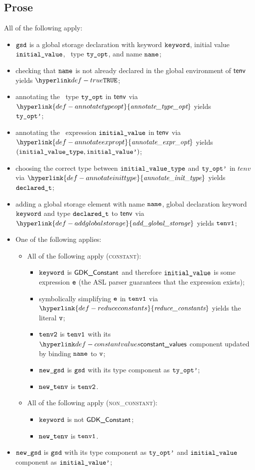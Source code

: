 \documentclass{book}
\newcommand\ProseOrTypeError[0]{\ProseTerminateAs{\TypeErrorConfig}}
\newcommand\annotatetypeopt[0]{\hyperlink{def-annotatetypeopt}{\textfunc{annotate\_type\_opt}}}
\newcommand\annotateexpropt[0]{\hyperlink{def-annotateexpropt}{\textfunc{annotate\_expr\_opt}}}
\newcommand\annotateinittype[0]{\hyperlink{def-annotateinittype}{\textfunc{annotate\_init\_type}}}
\newcommand\addglobalstorage[0]{\hyperlink{def-addglobalstorage}{\textfunc{add\_global\_storage}}}
\newcommand\reduceconstants[0]{\hyperlink{def-reduceconstants}{\textfunc{reduce\_constants}}}
\begin{document}
\subsection{Prose}
All of the following apply:
\begin{itemize}
  \item $\texttt{gsd}$ is a global storage declaration with keyword $\texttt{keyword}$, initial value \\ $\texttt{initial\_value}$,
        \optional\ type $\texttt{ty\_opt}$, and name $\texttt{name}$;
  \item checking that $\texttt{name}$ is not already declared in the global environment of $\textsf{tenv}$ yields $\True$\ProseOrTypeError;
  \item annotating the \optional\ type $\texttt{ty\_opt}$ in $\textsf{tenv}$ via $\annotatetypeopt$ yields \\
        $\texttt{ty\_opt'}$\ProseOrTypeError;
  \item annotating the \optional\ expression $\texttt{initial\_value}$ in $\textsf{tenv}$ via $\annotateexpropt$ yields
        $(\texttt{initial\_value\_type}, \texttt{initial\_value'})$\ProseOrTypeError;
  \item choosing the correct type between $\texttt{initial\_value\_type}$ and $\texttt{ty\_opt'}$ in $tenv$ via $\annotateinittype$ yields
        $\texttt{declared\_t}$;
  \item adding a global storage element with name $\texttt{name}$, global declaration keyword \\ $\texttt{keyword}$ and type $\texttt{declared\_t}$
        to $\textsf{tenv}$ via $\addglobalstorage$ yields $\texttt{tenv1}$\ProseOrTypeError;
  \item One of the following applies:
  \begin{itemize}
    \item All of the following apply (\textsc{constant}):
    \begin{itemize}
      \item $\texttt{keyword}$ is $\textsf{GDK\_Constant}$ and therefore $\texttt{initial\_value}$ is some expression $\texttt{e}$ (the ASL parser guarantees
            that the expression exists);
      \item symbolically simplifying $\texttt{e}$ in $\texttt{tenv1}$ via $\reduceconstants$ yields the literal $\texttt{v}$\ProseOrTypeError;
      \item $\texttt{tenv2}$ is $\texttt{tenv1}$ with its $\constantvalues$ component updated by binding $\texttt{name}$ to $\texttt{v}$;
      \item $\texttt{new\_gsd}$ is $\texttt{gsd}$ with its type component as $\texttt{ty\_opt'}$;
      \item $\texttt{new\_tenv}$ is $\texttt{tenv2}$.
    \end{itemize}

    \item All of the following apply (\textsc{non\_constant}):
    \begin{itemize}
      \item $\texttt{keyword}$ is not $\textsf{GDK\_Constant}$;
      \item $\texttt{new\_tenv}$ is $\texttt{tenv1}$.
    \end{itemize}
  \end{itemize}
  \item $\texttt{new\_gsd}$ is $\texttt{gsd}$ with its type component as $\texttt{ty\_opt'}$ and $\texttt{initial\_value}$ component as $\texttt{initial\_value'}$;
\end{itemize}
\end{document}
